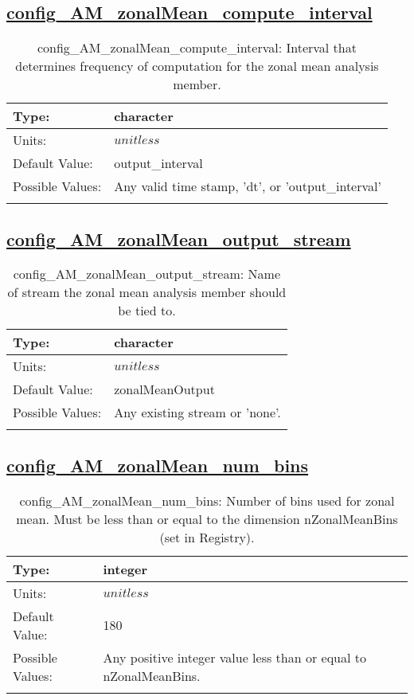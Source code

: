 \subsection[config\_AM\_zonalMean\_compute\_interval]{\hyperref[sec:nm_tab_AM_zonalMean]{config\_AM\_zonalMean\_compute\_interval}}
\label{subsec:nm_sec_config_AM_zonalMean_compute_interval}
\begin{center}
\begin{longtable}{| p{2.0in} || p{4.0in} |}
    \hline
    Type: & character \\
    \hline
    Units: & $unitless$ \\
    \hline
    Default Value: & output\_interval \\
    \hline
    Possible Values: & Any valid time stamp, 'dt', or 'output\_interval' \\
    \hline
    \caption{config\_AM\_zonalMean\_compute\_interval: Interval that determines frequency of computation for the zonal mean analysis member.}
\end{longtable}
\end{center}
\subsection[config\_AM\_zonalMean\_output\_stream]{\hyperref[sec:nm_tab_AM_zonalMean]{config\_AM\_zonalMean\_output\_stream}}
\label{subsec:nm_sec_config_AM_zonalMean_output_stream}
\begin{center}
\begin{longtable}{| p{2.0in} || p{4.0in} |}
    \hline
    Type: & character \\
    \hline
    Units: & $unitless$ \\
    \hline
    Default Value: & zonalMeanOutput \\
    \hline
    Possible Values: & Any existing stream or 'none'. \\
    \hline
    \caption{config\_AM\_zonalMean\_output\_stream: Name of stream the zonal mean analysis member should be tied to.}
\end{longtable}
\end{center}
\subsection[config\_AM\_zonalMean\_num\_bins]{\hyperref[sec:nm_tab_AM_zonalMean]{config\_AM\_zonalMean\_num\_bins}}
\label{subsec:nm_sec_config_AM_zonalMean_num_bins}
\begin{center}
\begin{longtable}{| p{2.0in} || p{4.0in} |}
    \hline
    Type: & integer \\
    \hline
    Units: & $unitless$ \\
    \hline
    Default Value: & 180 \\
    \hline
    Possible Values: & Any positive integer value less than or equal to nZonalMeanBins. \\
    \hline
    \caption{config\_AM\_zonalMean\_num\_bins: Number of bins used for zonal mean.  Must be less than or equal to the dimension nZonalMeanBins (set in Registry).}
\end{longtable}
\end{center}
